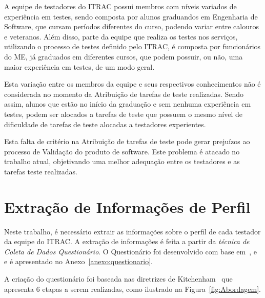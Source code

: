 A equipe de testadores do ITRAC possui membros com níveis variados de experiência em testes, sendo composta por alunos graduandos em Engenharia de Software, que cursam períodos diferentes do curso, podendo variar entre calouros e veteranos. Além disso, parte da equipe que realiza os testes nos serviços, utilizando o processo de testes definido pelo ITRAC, é composta por funcionários do ME, já graduados em diferentes cursos, que podem possuir, ou não, uma maior experiência em testes, de um modo geral.

Esta variação entre os membros da equipe e seus respectivos conhecimentos não é considerada no momento da Atribuição de tarefas de teste realizadas. Sendo assim, alunos que estão no início da graduação e sem nenhuma experiência em testes, podem ser alocados a tarefas de teste que possuem o mesmo nível de dificuldade de tarefas de teste alocadas a testadores experientes.

Esta falta de critério na Atribuição de tarefas de teste pode gerar prejuízos ao processo de Validação do produto de software. Este problema é atacado no trabalho atual, objetivando uma melhor adequação entre os testadores e as tarefas teste realizadas.

\section{Extração de Informações de Perfil}
\label{sec:extrair_caracteristicas}

Neste trabalho, é necessário extrair as informações sobre o perfil de cada testador da equipe do ITRAC. A extração de informações é feita a partir da \textit{técnica de Coleta de Dados Questionário}. O Questionário foi desenvolvido com base em~\cite{Santos19SDPA}, \cite{geras2004survey} e~\cite{groves2000survey} e é apresentado no Anexo~\ref{anexo:questionario}.

A criação do questionário foi baseada nas  diretrizes de Kitchenham~\cite{kitchenham2008personal} que apresenta 6 etapas a serem realizadas, como ilustrado na Figura~\ref{fig:Abordagem}.

